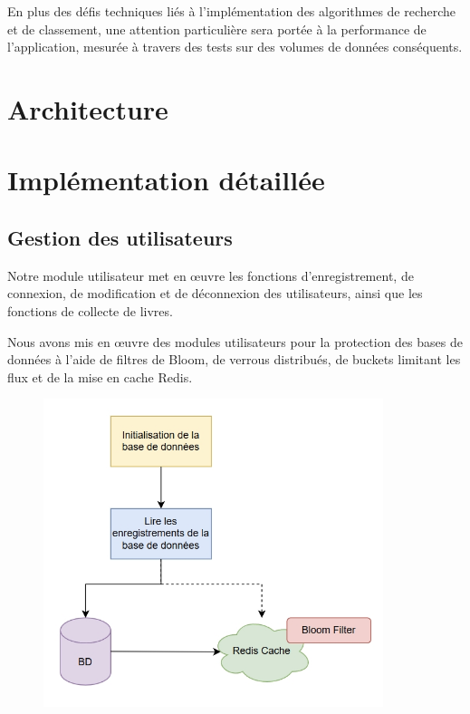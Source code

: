 \documentclass[11pt,english]{article}
\begin{document}
{\begin{itemize}
    \end{itemize}

    \indent En plus des défis techniques liés à l'implémentation des algorithmes de recherche et de classement, une attention particulière sera portée à la performance de l'application, mesurée à travers des tests sur des volumes de données conséquents. 

    \section{Architecture}

    \indent 



    \section{Implémentation détaillée}

    \subsection{Gestion des utilisateurs}


    \indent

    Notre module utilisateur met en œuvre les fonctions d'enregistrement, de connexion, de modification et de déconnexion des utilisateurs, ainsi que les fonctions de collecte de livres.

    \indent Nous avons mis en œuvre des modules utilisateurs pour la protection des bases de données à l'aide de filtres de Bloom, de verrous distribués, de buckets limitant les flux et de la mise en cache Redis.

    \begin{figure}[H]
        \begin{center}
            \includegraphics[height=9cm]{./src/DB_Init.png}
        \end{center}
    \end{figure}

}
\end{document}
